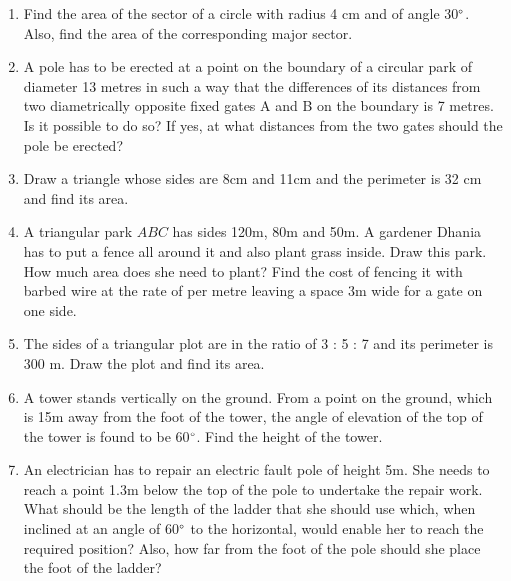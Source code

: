 \begin{enumerate}[label=\thesection.\arabic*.,ref=\thesection.\theenumi]
\item Find the area of the sector of a circle with radius 4 cm and of angle 30$\degree$. Also, find the area of the corresponding major sector.
\item A pole has to be erected at a point on the boundary of a circular park of diameter 13 metres in such a way that the differences of its distances from two diametrically opposite fixed gates A and B on the boundary is 7 metres. Is it possible to do so? If yes, at what distances from the two gates should the pole be erected?
%
\item Draw a triangle whose sides are 8cm and 11cm and the perimeter is 32 cm and find its area.
%
%
\item A triangular park $ABC$ has sides 120m, 80m and 50m. A gardener Dhania has to put a fence all around it and also plant grass inside. Draw this park.  How much area does she need to plant? Find the cost of fencing it with barbed wire at the rate of  per metre leaving a space 3m wide for a gate on one side.
%
\item The sides of a triangular plot are in the ratio of 3 : 5 : 7 and its perimeter is 300 m. Draw the plot and find its area.
\item A tower stands vertically on the ground.  From a point on the ground, which is 15m away from the foot of the tower, the angle of elevation of the top of the tower is found to be 60$\degree$.  Find the height of the tower.
%
%
\item An electrician has to repair an electric fault pole of height 5m.  She needs to reach a point 1.3m below the top of the pole to undertake the repair work.  What should be the length of the ladder that she should use which, when inclined at an angle of 60$\degree$ to the horizontal, would enable her to reach the required position?  Also, how far from the foot of the pole should she place the foot of the ladder?

\end{enumerate}
